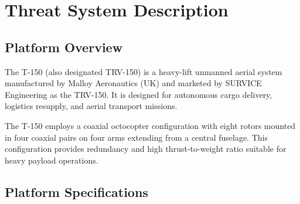 \pagebreak


\section{\unclass Threat System Description}\label{sec:ThreatSystemDescription}

\subsection{\unclass Platform Overview}\label{sec:PlatformOverview}

\unclass The T-150 (also designated TRV-150) is a heavy-lift unmanned aerial system manufactured by Malloy Aeronautics (UK) and marketed by SURVICE Engineering as the TRV-150. It is designed for autonomous cargo delivery, logistics resupply, and aerial transport missions.

\unclass The T-150 employs a coaxial octocopter configuration with eight rotors mounted in four coaxial pairs on four arms extending from a central fuselage. This configuration provides redundancy and high thrust-to-weight ratio suitable for heavy payload operations.

\subsection{\unclass Platform Specifications}\label{sec:PlatformSpecs}

